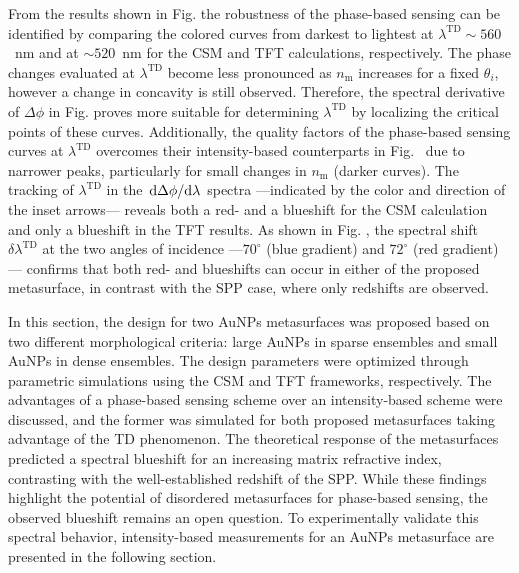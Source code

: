 From the results shown in Fig.   the robustness of the phase-based sensing can be identified by comparing the colored curves from darkest to lightest at $\lambda^\text{TD} \sim 560$~nm and at $\sim 520$~nm for the CSM and TFT calculations, respectively. The phase changes evaluated at $\lambda^\text{TD}$ become less pronounced as $n_\text{m}$ increases for a fixed $\theta_i$, however a change in concavity is still observed. Therefore, the spectral derivative of $\Delta\phi$ in  Fig.  proves more suitable for determining $\lambda^\text{TD}$ by localizing the critical points of these curves. Additionally, the quality factors of the phase-based sensing curves at $\lambda^\text{TD}$ overcomes their intensity-based counterparts in Fig.~ due to narrower peaks, particularly for small changes in $n_\text{m}$ (darker curves). The tracking of  $\lambda^\text{TD}$  in the $\dv*{\Delta\phi}{\lambda}$ spectra ---indicated by the color and direction of the inset arrows--- reveals both  a red- and a blueshift for the CSM calculation and only a blueshift in the TFT results. As shown in Fig. , the spectral shift $\delta\lambda^\text{TD}$ at the two angles of incidence ---$70^\circ$ (blue gradient) and $72^\circ$ (red gradient)--- confirms that both red- and blueshifts  can occur in either of the proposed metasurface, in contrast with the SPP case, where only redshifts are observed.

In this section, the design for two AuNPs metasurfaces was proposed based on two different morphological criteria: large AuNPs in sparse ensembles and small AuNPs in dense ensembles. The design parameters were optimized through parametric simulations using the CSM and TFT frameworks, respectively. The advantages of a phase-based sensing scheme over an intensity-based scheme were discussed, and the former was simulated for both proposed metasurfaces taking advantage of the TD phenomenon. The theoretical response of the metasurfaces predicted a spectral blueshift for an increasing matrix refractive index, contrasting with the well-established redshift of the SPP. While these findings highlight the potential of disordered metasurfaces for phase-based sensing, the observed blueshift remains an open question. To experimentally validate this spectral behavior, intensity-based measurements for an AuNPs metasurface are presented in the following section.


















